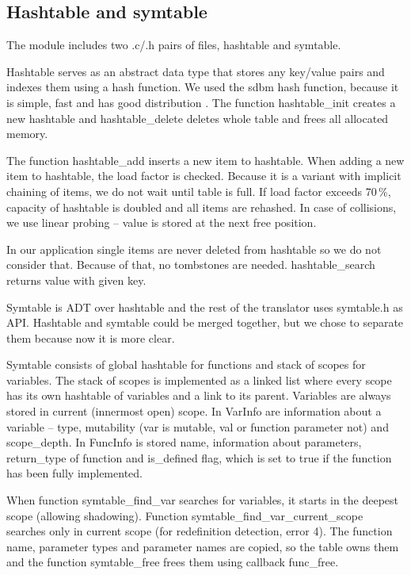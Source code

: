 \documentclass[a4paper,11pt]{article}
\begin{document}
\subsection{Hashtable and symtable}

The module includes two .c/.h pairs of files, hashtable and symtable.

Hashtable serves as an abstract data type that stores any key/value pairs and indexes them
using a hash function. We used the sdbm hash function, because it is simple, fast and has
good distribution \cite{sdbm}. The function hashtable\_init creates a new
hashtable and hashtable\_delete deletes whole table and frees all allocated
memory.

The function hashtable\_add inserts a new item to hashtable. When adding a new
item to hashtable, the load factor is checked. Because it is a variant with implicit
chaining of items, we do not wait until table is full. If load factor exceeds 70\,\%,
capacity of hashtable is doubled and all items are rehashed. In case of collisions, we use
linear probing -- value is stored at the next free position.

In our application single items are never deleted from hashtable so we do not consider
that. Because of that, no tombstones are needed. hashtable\_search returns value
with given key.

Symtable is ADT over hashtable and the rest of the translator uses symtable.h as
API. Hashtable and symtable could be merged together, but we chose to separate them
because now it is more clear.

Symtable consists of global hashtable for functions and stack of scopes for variables. The
stack of scopes is implemented as a linked list where every scope has its own hashtable of
variables and a link to its parent. Variables are always stored in current (innermost
open) scope. In VarInfo are information about a variable -- type, mutability
(var is mutable, val or function parameter not) and
scope\_depth. In FuncInfo is stored name, information about parameters,
return\_type of function and is\_defined flag, which is set to true if
the function has been fully implemented.

When function symtable\_find\_var searches for variables, it starts in the
deepest scope (allowing shadowing). Function symtable\_find\_var\_current\_scope
searches only in current scope (for redefinition detection, error 4). The function name,
parameter types and parameter names are copied, so the table owns them and the function
symtable\_free frees them using callback func\_free.
\end{document}
